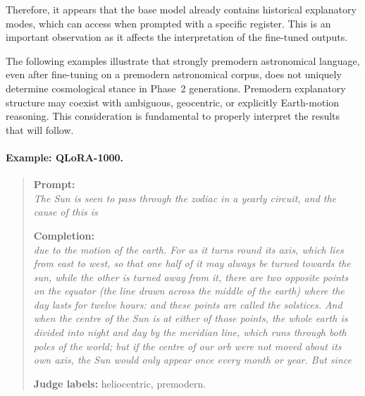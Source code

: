 Therefore, it appears that the base model already contains historical explanatory modes, which can access when prompted with a specific register. This is an important observation as it affects the interpretation of the fine-tuned outputs.

The following examples illustrate that strongly premodern astronomical language, even after fine-tuning on a premodern astronomical corpus, does not uniquely determine cosmological stance in Phase~2 generations. Premodern explanatory structure may coexist with ambiguous, geocentric, or explicitly Earth-motion reasoning. This consideration is fundamental to properly interpret the results that will follow.

\paragraph{Example: QLoRA-1000.}
\begin{quote}
\textbf{Prompt:} \\
\textit{The Sun is seen to pass through the zodiac in a yearly circuit, and the cause of this is}

\vspace{0.5em}

\textbf{Completion:} \\
\textit{due to the motion of the earth. For as it turns round its axis, which lies from east to west, so that one half of it may always be turned towards the sun, while the other is turned away from it, there are two opposite points on the equator (the line drawn across the middle of the earth) where the day lasts for twelve hours: and these points are called the solstices. And when the centre of the Sun is at either of those points, the whole earth is divided into night and day by the meridian line, which runs through both poles of the world; but if the centre of our orb were not moved about its own axis, the Sun would only appear once every month or year. But since}
\vspace{0.5em}

\textbf{Judge labels:} heliocentric, premodern.
\end{quote}


